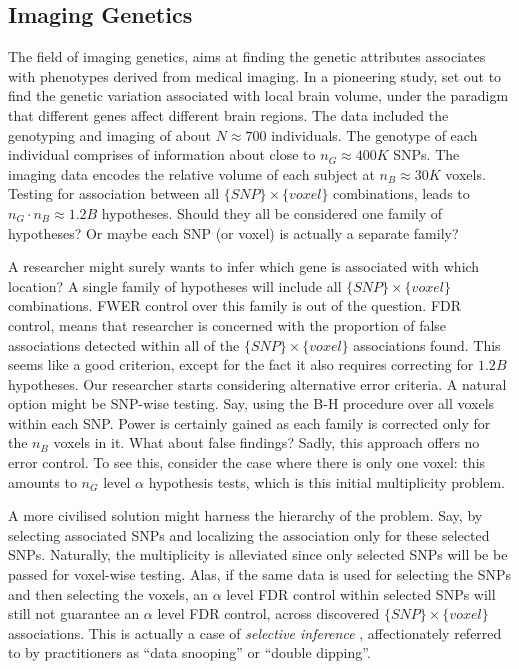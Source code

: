 \documentclass[review,12pt]{article}
\begin{document}


\subsection{\label{eg:imaging_genetics}Imaging Genetics}

The field of imaging genetics, aims at finding the genetic attributes associates with phenotypes derived from medical imaging. In a pioneering study, \citet{stein_voxelwise_2010} set out to find the genetic variation associated with local brain volume, under the paradigm that different genes affect different brain regions. 
The data included the genotyping and imaging of about $N \approx 700$ individuals. 
The genotype of each individual comprises of information about close to $n_G \approx 400K$ SNPs. 
The imaging data encodes the relative volume of each subject at $n_B \approx 30K$ voxels. 
Testing for association between all $\{SNP\} \times \{voxel\}$ combinations, leads to $n_G \cdot n_B \approx 1.2B$ hypotheses. Should they all be considered one family of hypotheses? Or maybe each SNP (or voxel) is actually a separate family? 

A researcher might surely wants to infer which gene is associated with which location? 
A single family of hypotheses will include all $\{SNP\} \times \{voxel\}$ combinations. 
FWER control over this family is out of the question. 
FDR control, means that researcher is concerned with the proportion of false associations detected within all of the $\{SNP\} \times \{voxel\}$ associations found. This seems like a good criterion, except for the fact it also requires correcting for $1.2B$ hypotheses. 
Our researcher starts considering alternative error criteria. 
A natural option might be SNP-wise testing. Say, using the B-H procedure over all voxels within each SNP. Power is certainly gained as each family is corrected only for the $n_B$ voxels in it. 
What about false findings? Sadly, this approach offers no error control. To see this, consider the case where there is only one voxel: this amounts to $n_G$ level $\alpha$ hypothesis tests, which is this initial multiplicity problem. 

A more civilised solution might harness the hierarchy of the problem. Say, by selecting associated SNPs and localizing the association only for these selected SNPs. 
Naturally, the multiplicity is alleviated since only selected SNPs will be be passed for voxel-wise testing. Alas, if the same data is used for selecting the SNPs and then selecting the voxels, an $\alpha$ level FDR control within selected SNPs will still not guarantee an $\alpha$ level FDR control, across discovered $\{SNP\} \times \{voxel\}$ associations. This is actually a case of \emph{selective inference} \citep{benjamini_simultaneous_2010}, affectionately referred to by practitioners as ``data snooping'' or ``double dipping''. 
\end{document}
